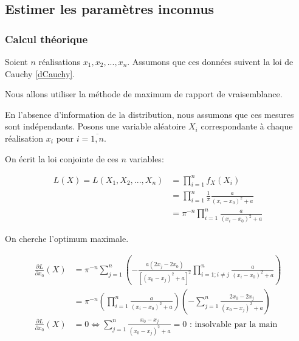 \documentclass[12pt,a4paper,titlepage]{article}
\numberwithin{equation}{section}
\begin{document}
\subsection{Estimer les paramètres inconnus}

\subsubsection*{Calcul théorique}

Soient $n$ réalisations $x_1, x_2, ..., x_n$. Assumons que ces données suivent la loi de Cauchy \eqref{dCauchy}.

Nous allons utiliser la méthode de maximum de rapport de vraisemblance.

En l'absence d'information de la distribution, nous assumons que ces mesures sont indépendants. Posons une variable aléatoire $X_i$ correspondante à chaque réalisation $x_i$ pour $i=\overline{1, n}$.

On écrit la loi conjointe de ces $n$ variables:

\begin{align*}
L (X) = L\left( {{X_1},{X_2},...,{X_n}} \right) & = \prod\limits_{i = 1}^n {{f_X}\left( {{X_i}} \right)} \\
& = \prod\limits_{i = 1}^n {\frac{1}{\pi }\frac{a}{{{{\left( {{x_i} - {x_0}} \right)}^2} + a}}} \\
& = {\pi ^{ - n}}\prod\limits_{i = 1}^n {\frac{a}{{{{\left( {{x_i} - {x_0}} \right)}^2} + a}}}
\end{align*}

On cherche l'optimum maximale.

\begin{align*}
\frac{{\partial L}}{{\partial {x_0}}}\left( X \right) & = {\pi ^{ - n}}\sum\limits_{j = 1}^n {\left( { - \frac{{a\left( {2{x_j} - 2{x_0}} \right)}}{{{{\left[ {{{\left( {{x_0} - {x_j}} \right)}^2} + a} \right]}^2}}}\prod\limits_{i = 1;i \ne j}^n {\frac{a}{{{{\left( {{x_i} - {x_0}} \right)}^2} + a}}} } \right)}\\
&  = {\pi ^{ - n}}\left( {\prod\limits_{i = 1}^n {\frac{a}{{{{\left( {{x_i} - {x_0}} \right)}^2} + a}}} } \right)\left( { - \sum\limits_{j = 1}^n {\frac{{2{x_0} - 2{x_j}}}{{{{\left( {{x_0} - {x_j}} \right)}^2} + a}}} } \right) \\
\frac{{\partial L}}{{\partial {x_0}}}\left( X \right) & = 0 \Leftrightarrow \sum\limits_{j = 1}^n {\frac{{{x_0} - {x_j}}}{{{{\left( {{x_0} - {x_j}} \right)}^2} + a}}}  = 0 \text{ : insolvable par la main}
\end{align*}
\end{document}
